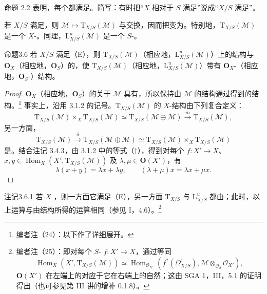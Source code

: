 命题 2.2 表明，每个都满足。简写：有时把“$X$ 相对于 $S$ 满足”说成“$X/S$ 满足”。

若 $X/S$ 满足，则 $\mathcal M\mapsto\mathrm T_{X/S}(\mathcal M)$ 与交换，因而把变为。特别地，$\mathrm T_{X/S}(\mathcal M)$ 是一个 $X$-。同理，$\mathrm L^u_{X/S}(\mathcal M)$ 是一个 $S$-。
\begin{SGAresult}{命题}{3.6}
若 $X/S$ 满足（E），则 $\mathrm T_{X/S}(\mathcal M)$（相应地，$\mathrm L^u_{X/S}(\mathcal M)$）上的结构与 $\mathbf O_X$（相应地，$\mathbf O_S$）的，使 $\mathrm T_{X/S}(\mathcal M)$（相应地，$\mathrm L^u_{X/S}(\mathcal M)$）带有 $\mathbf O_X$-（相应地，$\mathbf O_S$-）结构。
\end{SGAresult}
\begin{proof}
$\mathbf O_X$（相应地，$\mathbf O_S$）的关于 $\mathcal M$ 具有，所以保持由 $\mathcal M$ 的结构通过得到的结构。\footnote{编者注（24）：以下作了详细展开。} 事实上，沿用 3.1.2 的记号。$\mathrm T_{X/S}(\mathcal M)$ 的 $X$-结构由下列复合定义：
\[
\mathrm T_{X/S}(\mathcal M)\times_X\mathrm T_{X/S}(\mathcal M)
\simeq\mathrm T_{X/S}(\mathcal M\oplus\mathcal M)
\xrightarrow m\mathrm T_{X/S}(\mathcal M),
\]
另一方面，
\[
\mathrm T_{X/S}(\mathcal M)\xrightarrow\delta
\mathrm T_{X/S}(\mathcal M\oplus\mathcal M)
\simeq\mathrm T_{X/S}(\mathcal M)\times_X\mathrm T_{X/S}(\mathcal M)
\]
是。结合注记 3.4.3，由 3.1.2 中的等式（$\dagger$），得到对每个 $f:X'\to X$、$x,y\in\operatorname{Hom}_X(X',\mathrm T_{X/S}(\mathcal M))$ 及 $\lambda,\mu\in\mathbf O(X')$，有
\[
\lambda(x+y)=\lambda x+\lambda y,\qquad
(\lambda+\mu)x=\lambda x+\mu x.
\]
\end{proof}
\begin{SGAresult}{注记}{3.6.1}
若 $X$ ，则一方面它满足（E），另一方面 $\mathrm T_{X/S}$ 与 $\mathrm L^u_{X/S}$ 都由；此时，以上运算与由结构所得的运算相同（参见 I，4.6）。\footnote{编者注（25）：即对每个 $S$- $f:X'\to X$，通过等同
\[
\operatorname{Hom}_X(X',\mathrm T_{X/S}(\mathcal M))
\simeq\operatorname{Hom}_{\mathcal O_{X'}}(f^*(\Omega^1_{X/S}),\mathcal M\otimes_{\mathcal O_S}\mathcal O_{X'}),
\]
$\mathbf O(X')$ 在左端上的对应于它在右端上的自然；这由 SGA 1，III，5.1 的证明得出（也可参见第 III 讲的增补 0.1.8）。}
\end{SGAresult}
